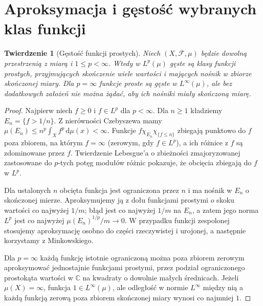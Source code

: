 \documentclass[11pt,a4paper,oneside]{book}
\numberwithin{equation}{chapter}
\theoremstyle{plain}
\newtheorem{twierdzenie}{Twierdzenie}[chapter]
\theoremstyle{definition}
\theoremstyle{remark}
\begin{document}
\section{Aproksymacja i gęstość wybranych klas funkcji}

\begin{twierdzenie}[Gęstość funkcji prostych]
\label{thm:simple-dense-lp-14}
Niech $(X,\mathcal F,\mu)$ będzie dowolną przestrzenią
z miarą i $1\le p<\infty$. Wtedy w $L^p(\mu)$ gęste są
klasy funkcji prostych, przyjmujących skończenie wiele
wartości i mających nośnik w zbiorze skończonej miary.
Dla $p=\infty$ funkcje proste są gęste w $L^\infty(\mu)$,
ale bez dodatkowych założeń nie można żądać, aby
ich nośniki miały skończoną miarę.
\end{twierdzenie}
\begin{proof}
Najpierw niech $f\ge0$ i $f\in L^p$ dla $p<\infty$.
Dla $n\ge1$ kładziemy $E_n=\{f>1/n\}$.
Z nierówności Czebyszewa mamy
$\mu(E_n)\le n^p\int_Xf^p\,\mathrm d\mu(x)<\infty$.
Funkcje $f\chi_{E_n}\chi_{\{f\le n\}}$
zbiegają punktowo do $f$ poza zbiorem, na którym
$f=\infty$ (zerowym, gdy $f\in L^p$), a ich
różnice z $f$ są zdominowane przez $f$.
Twierdzenie Lebesgue'a o zbieżności zmajoryzowanej
zastosowane do $p$-tych potęg modułów różnic pokazuje,
że obcięcia zbiegają do $f$ w $L^p$.

Dla ustalonych $n$ obcięta funkcja jest ograniczona
przez $n$ i ma nośnik w $E_n$ o skończonej mierze.
Aproksymujemy ją z dołu funkcjami prostymi
$o$ skoku wartości co najwyżej $1/m$; błąd
jest co najwyżej $1/m$ na $E_n$, a zatem jego
norma $L^p$ jest co najwyżej
$\mu(E_n)^{1/p}/m\to0$. W przypadku funkcji
zespolonej stosujemy aproksymację osobno do
części rzeczywistej i urojonej, a następnie
korzystamy z Minkowskiego.

Dla $p=\infty$ każdą funkcję istotnie ograniczoną
można poza zbiorem zerowym aproksymować
jednostajnie funkcjami prostymi, przez podział
ograniczonego prostokąta wartości w $\mathbb C$
na kwadraty o dowolnie małych średnicach.
Jeżeli $\mu(X)=\infty$, funkcja $1\in L^\infty(\mu)$,
ale odległość w normie $L^\infty$ między nią
a każdą funkcją zerową poza zbiorem skończonej
miary wynosi co najmniej $1$.
\end{proof}
\end{document}
